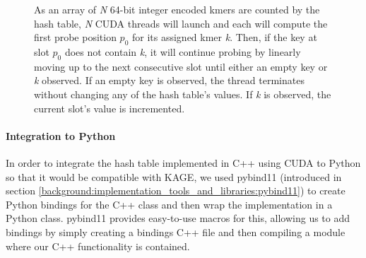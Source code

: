 \begin{figure}[H]
\begin{center}
{
}
\caption{
  As an array of \textit{N} 64-bit integer encoded kmers are counted by the hash table, \textit{N} CUDA threads will launch and each will compute the first probe position $p_0$ for its assigned kmer \textit{k}. Then, if the key at slot $p_0$ does not contain \textit{k}, it will continue probing by linearly moving up to the next consecutive slot until either an empty key or \textit{k} observed. If an empty key is observed, the thread terminates without changing any of the hash table's values. If \textit{k} is observed, the current slot's value is incremented.
}
\label{methods:gpu_accelerating_kmer_counting:figures:count_example}
\end{center}
\end{figure}

\paragraph{Integration to Python}
In order to integrate the hash table implemented in C++ using CUDA to Python so that it would be compatible with KAGE, we used pybind11 (introduced in section \ref{background:implementation_tools_and_libraries:pybind11}) to create Python bindings for the C++ class and then wrap the implementation in a Python class.
pybind11 provides easy-to-use macros for this, allowing us to add bindings by simply creating a bindings C++ file and then compiling a module where our C++ functionality is contained.

